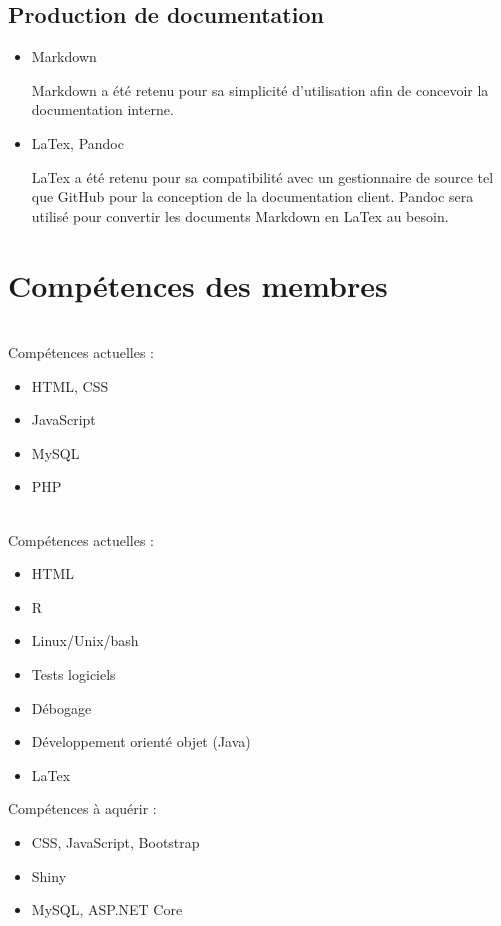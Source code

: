 \documentclass[letter,12pt]{exam}
\begin{document}
\subsection{Production de documentation}

\begin{itemize}

\item
  Markdown
  
  Markdown a été retenu pour sa simplicité d'utilisation afin de concevoir la documentation interne.
\item
  LaTex, Pandoc
  
  LaTex a été retenu pour sa compatibilité avec un gestionnaire de source tel que GitHub pour la conception de la documentation client. Pandoc sera utilisé pour convertir les documents Markdown en LaTex au besoin.
  
\end{itemize}

\section{Compétences des membres}

\\

Compétences actuelles :

\begin{itemize}
\item
  HTML, CSS
  
\item JavaScript

\item MySQL

\item PHP

\end{itemize}

\\

Compétences actuelles :

\begin{itemize}
\item HTML
  
\item R

\item Linux/Unix/bash

\item Tests logiciels

\item Débogage

\item Développement orienté objet (Java)

\item LaTex

\end{itemize}


Compétences à aquérir :

\begin{itemize}

\item CSS, JavaScript, Bootstrap

\item Shiny

\item MySQL, ASP.NET Core

\end{itemize}
\end{document}
